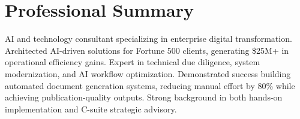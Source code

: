 
\section{Professional Summary}
\small{
  AI and technology consultant specializing in enterprise digital transformation. Architected AI-driven solutions for Fortune 500 clients, generating \$25M+ in operational efficiency gains. Expert in technical due diligence, system modernization, and AI workflow optimization. Demonstrated success building automated document generation systems, reducing manual effort by 80\% while achieving publication-quality outputs. Strong background in both hands-on implementation and C-suite strategic advisory.
}